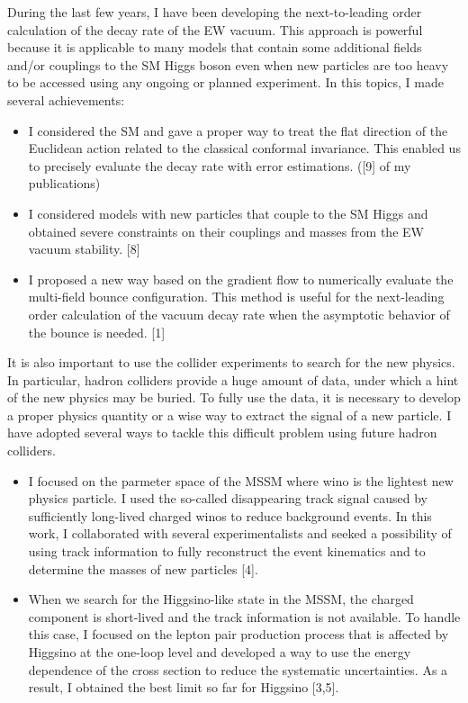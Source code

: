 \documentclass[12pt,notitlepage]{article}
\begin{document}
During the last few years, I have been developing the next-to-leading order calculation of the decay rate of the EW vacuum.
This approach is powerful because it is applicable to many models that contain some additional fields and/or couplings to the SM Higgs boson even when new particles are too heavy to be accessed using any ongoing or planned experiment.
In this topics, I made several achievements:
\vspace{-1.3mm}
\begin{itemize}
  \setlength{\parskip}{0mm}
  \setlength{\itemsep}{1mm}
  \item
    I considered the SM and gave a proper way to treat the flat direction of the Euclidean action related to the classical conformal invariance.
    This enabled us to precisely evaluate the decay rate with error estimations. ([9] of my publications)
  \item
    I considered models with new particles that couple to the SM Higgs and obtained severe constraints on their couplings and masses from the EW vacuum stability. [8]
  \item
    I proposed a new way based on the gradient flow to numerically evaluate the multi-field bounce configuration.
    This method is useful for the next-leading order calculation of the vacuum decay rate when the asymptotic behavior of the bounce is needed. [1]
\end{itemize}

It is also important to use the collider experiments to search for the new physics.
In particular, hadron colliders provide a huge amount of data, under which a hint of the new physics may be buried.
To fully use the data, it is necessary to develop a proper physics quantity or a wise way to extract the signal of a new particle.
I have adopted several ways to tackle this difficult problem using future hadron colliders.
\vspace{-1.3mm}
\begin{itemize}
  \setlength{\parskip}{0mm}
  \setlength{\itemsep}{1mm}
  \item
    I focused on the parmeter space of the MSSM where wino is the lightest new physics particle.
    I used the so-called disappearing track signal caused by sufficiently long-lived charged winos to reduce background events.
    In this work, I collaborated with several experimentalists and seeked a possibility of using track information to fully reconstruct the event kinematics and to determine the masses of new particles [4].
  \item
    When we search for the Higgsino-like state in the MSSM, the charged component is short-lived and the track information is not available.
    To handle this case, I focused on the lepton pair production process that is affected by Higgsino at the one-loop level and developed a way to use the energy dependence of the cross section to reduce the systematic uncertainties.
    As a result, I obtained the best limit so far for Higgsino [3,5].
\end{itemize}
\end{document}
